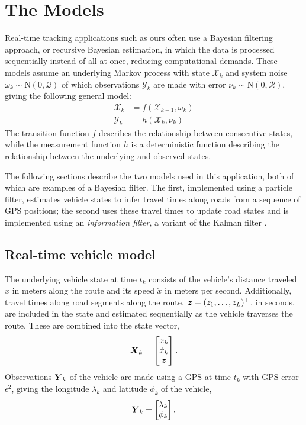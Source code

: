 \section{The Models}
\label{sec:models}

Real-time tracking applications such as ours often use
a Bayesian filtering approach,
or recursive Bayesian estimation,
in which the data is processed sequentially instead of all at once,
reducing computational demands.
These models assume an underlying Markov process with state $\mathcal{X}_k$
and system noise $\omega_k\sim\mathrm{N}(0,\mathcal{Q})$ 
of which observations $\mathcal{Y}_k$ are made
with error $\nu_k\sim\mathrm{N}(0,\mathcal{R})$,
giving the following general model:
\begin{equation}
\label{eq:rbe_model}
\begin{split}
\mathcal{X}_k &= f(\mathcal{X}_{k-1}, \omega_k) \\
\mathcal{Y}_k &= h(\mathcal{X}_k, \nu_k)
\end{split}
\end{equation}
The transition function $f$ describes the relationship between consecutive states,
while the measurement function $h$ is a deterministic function describing the
relationship between the underlying and observed states.

The following sections describe the two models used in this application,
both of which are examples of a Bayesian filter.
The first, implemented using a particle filter, estimates vehicle states
to infer travel times along roads from a sequence of GPS positions;
the second uses these travel times to update road states 
and is implemented using an \emph{information filter},
a variant of the Kalman filter \citep{Anderson_2012}.

\subsection{Real-time vehicle model}
\label{sec:pf}

The underlying vehicle state at time $t_k$ consists of
the vehicle's distance traveled $x$ in meters along the route and
its speed $\dot x$ in meters per second.
Additionally, travel times along road segments along the route, 
$\boldsymbol{z} = (z_1,\ldots,z_L)^\top$, in seconds,
are included in the state and estimated
sequentially as the vehicle traverses the route.
These are combined into the state vector,
\begin{equation}
\label{eq:vehicle_state}
\mbox{$\boldsymbol{X}$}_k = 
\begin{bmatrix}
    x_k \\ \dot x_k \\ \boldsymbol{z}
\end{bmatrix}.
\end{equation}
Observations $\mbox{$\boldsymbol{Y}$}_k$ of the vehicle are made using a GPS at time $t_k$
with GPS error $\epsilon^2$,
giving the longitude $\lambda_k$ and latitude $\phi_k$ of the vehicle,
\begin{equation}
\label{eq:vehicle_obs}
\mbox{$\boldsymbol{Y}$}_k = \begin{bmatrix} \lambda_k \\ \phi_k \end{bmatrix}.
\end{equation}


